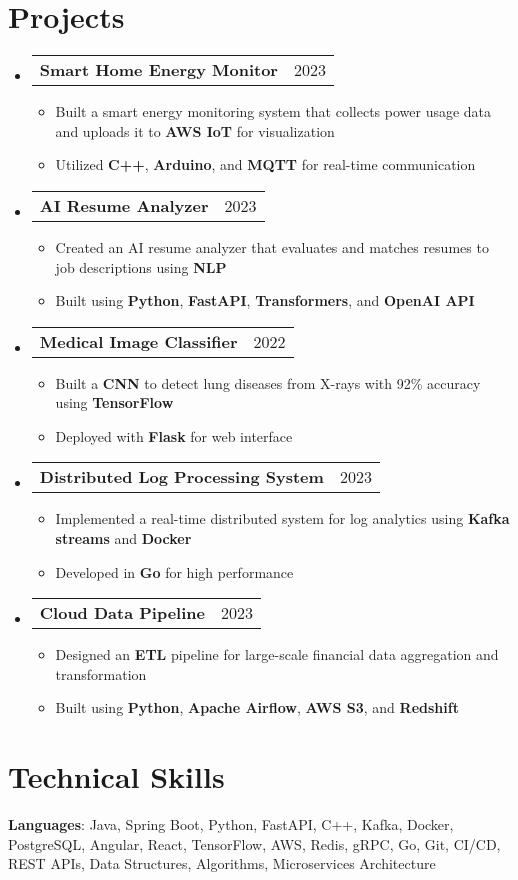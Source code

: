 \documentclass[letterpaper,11pt]{article}
\makeatletter
\newcommand{\resumeItem}[1]{
    \item\small{
            {#1 \vspace{-2pt}}
    }
}
\newcommand{\resumeProjectHeading}[2]{
    \item
    \begin{tabular*}{0.97\textwidth}{l@{\extracolsep{\fill}}r}
    \small#1 & #2 \\
    \end{tabular*}\vspace{-7pt}
}
\newcommand{\resumeSubHeadingListStart}{\begin{itemize}[leftmargin=0.15in, label={}]}
\newcommand{\resumeSubHeadingListEnd}{\end{itemize}}
\newcommand{\resumeItemListStart}{\begin{itemize}}
\newcommand{\resumeItemListEnd}{\end{itemize}\vspace{-5pt}}
\makeatother
\begin{document}
\section{Projects}
\resumeSubHeadingListStart
\resumeProjectHeading
{\textbf{Smart Home Energy Monitor}}{2023}
\resumeItemListStart
\resumeItem{ Built a smart energy monitoring system that collects power usage data and uploads it to \textbf{AWS IoT} for visualization}
\resumeItem{ Utilized \textbf{C++}, \textbf{Arduino}, and \textbf{MQTT} for real-time communication}
\resumeItemListEnd
\resumeProjectHeading
{\textbf{AI Resume Analyzer}}{2023}
\resumeItemListStart
\resumeItem{ Created an AI resume analyzer that evaluates and matches resumes to job descriptions using \textbf{NLP}}
\resumeItem{ Built using \textbf{Python}, \textbf{FastAPI}, \textbf{Transformers}, and \textbf{OpenAI API}}
\resumeItemListEnd
\resumeProjectHeading
{\textbf{Medical Image Classifier}}{2022}
\resumeItemListStart
\resumeItem{ Built a \textbf{CNN} to detect lung diseases from X-rays with 92\% accuracy using \textbf{TensorFlow}}
\resumeItem{ Deployed with \textbf{Flask} for web interface}
\resumeItemListEnd
\resumeProjectHeading
{\textbf{Distributed Log Processing System}}{2023}
\resumeItemListStart
\resumeItem{ Implemented a real-time distributed system for log analytics using \textbf{Kafka streams} and \textbf{Docker}}
\resumeItem{ Developed in \textbf{Go} for high performance}
\resumeItemListEnd
\resumeProjectHeading
{\textbf{Cloud Data Pipeline}}{2023}
\resumeItemListStart
\resumeItem{ Designed an \textbf{ETL} pipeline for large-scale financial data aggregation and transformation}
\resumeItem{ Built using \textbf{Python}, \textbf{Apache Airflow}, \textbf{AWS S3}, and \textbf{Redshift}}
\resumeItemListEnd
\resumeSubHeadingListEnd

\section{Technical Skills}
\begin{itemize}[leftmargin=0.15in, label={}]
\small{\item{
\textbf{Languages}: Java, Spring Boot, Python, FastAPI, C++, Kafka, Docker, PostgreSQL, Angular, React, TensorFlow, AWS, Redis, gRPC, Go, Git, CI/CD, REST APIs, Data Structures, Algorithms, Microservices Architecture
}}
\end{itemize}
\end{document}
